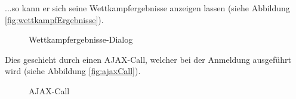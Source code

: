 ...so kann er sich seine Wettkampfergebnisse anzeigen lassen (siehe Abbildung \vref{fig:wettkampfErgebnisse}).
\begin{figure}[!h]
	\caption{Wettkampfergebnisse-Dialog}
	\label{fig:wettkampfErgebnisse}
\end{figure}

Dies geschieht durch einen AJAX-Call, welcher bei der Anmeldung ausgeführt wird (siehe Abbildung \vref{fig:ajaxCall}).

\begin{figure}[!h]
	\caption{AJAX-Call}
	\label{fig:ajaxCall}
\end{figure}

